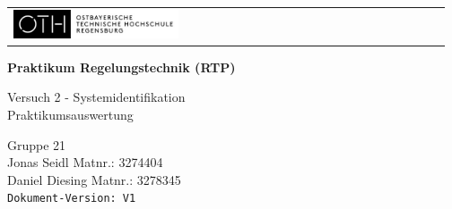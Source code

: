 \documentclass[12pt, oneside, a4paper]{scrreprt}
\begin{document}
 \begin{titlepage}

	\begin{tabular}{l r} 
 
    \includegraphics[width=0.4\textwidth]{Bilder/oth-regensburg-logo}
      &
		
   \end{tabular}


   \begin{minipage} [c] [8.5cm] [b] {\textwidth}
      \Huge{
         \begin{center}
            \textbf{Praktikum Regelungstechnik (RTP)}\\[0.8cm]
             \par
              {\large Versuch 2 - Systemidentifikation }\\[1cm]
              {\large Praktikumsauswertung} \\[1cm]
          \end{center}
           }
      
      
   \end{minipage}

 \vspace{0.1cm}












	
   \begin{minipage} [c] [3.5cm] [b] {\textwidth}
    \begin{center}
    
    
       \vspace{0.3cm}
       Gruppe 21\\
       Jonas Seidl Matnr.: 3274404 \\
       Daniel Diesing Matnr.: 3278345\\
       \vspace{0.5cm}
       \texttt{Dokument-Version: V1}\\
	\end{center}
  
   \end{minipage}


\end{titlepage}
\end{document}
